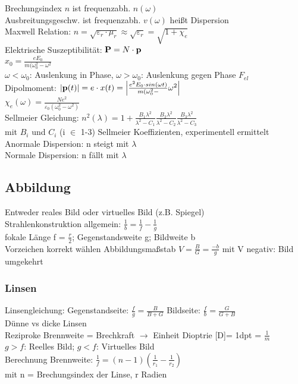 \documentclass[fs, footer]{latex4ei}
\begin{document}
\begin{multicols*}{4}
Brechungsindex $n$ ist frequenzabh. $n(\omega)$\\
Ausbreitungsgeschw. ist frequenzabh. $v(\omega)$ heißt Dispersion\\
Maxwell Relation: $n = \sqrt{\varepsilon_r\cdot \mu_r} \approx \sqrt{\varepsilon_r} = \sqrt{1+\chi_e}$\\ %
Elektrische Suszeptibilität: $\textbf{P} = N \cdot \textbf{p}$\\%
$x_0 = \frac{eE_0}{m(\omega_0^2-\omega^2}$\\
$\omega < \omega_0$: Auslenkung in Phase,
$\omega > \omega_0$: Auslenkung gegen Phase $F_{el}$\\
Dipolmoment: $|\textbf{p}(t)| = e\cdot x(t) = \left|\frac{e^2E_0\cdot sin(\omega t)}{m(\omega_0^2-}\omega^2\right|$\\ %
$\chi _e(\omega) = \frac{Ne^2}{\varepsilon_0(\omega_0^2 - \omega^2)}$\\
Sellmeier Gleichung: $n^2(\lambda) = 1 + \frac{B_1\lambda^2}{\lambda^2-C_1}\frac{B_2\lambda^2}{\lambda^2-C_2}\frac{B_3\lambda^2}{\lambda^2-C_3}$\\ mit $B_i$ und $C_i$ (i $\in$ 1-3) Sellmeier Koeffizienten, experimentell ermittelt\\
Anormale Dispersion: n steigt mit $\lambda$\\
Normale Dispersion: n fällt mit $\lambda$\\
\subsection{Abbildung}
Entweder reales Bild oder virtuelles Bild (z.B. Spiegel)\\
Strahlenkonstruktion allgemein: $\frac{1}{b}= \frac{1}{f} - \frac{1}{g}$\\
fokale Länge f = $\frac{r}{2}$; Gegenstandsweite g; Bildweite b\\
Vorzeichen korrekt wählen %
Abbildungsmaßstab $V = \frac{B}{G}=\frac{-b}{g}$ mit V negativ: Bild umgekehrt\\
\subsubsection{Linsen}
Linsengleichung:
Gegenstandseite: $\frac{f}{g} = \frac{B}{B+G}$
Bildseite: $\frac{f}{b}= \frac{G}{G+B}$\\
Dünne vs dicke Linsen\\ %
Reziproke Brennweite = Brechkraft $\rightarrow$ Einheit Dioptrie [D]= 1dpt = $\frac{1}{m}$\\
$g>f$: Reelles Bild;
$g<f$: Virtuelles Bild\\
Berechnung Brennweite: $\frac{1}{f}=(n-1)(\frac{1}{r_1}-\frac{1}{r_2})$\\
mit n = Brechungsindex der Linse, r Radien

\end{multicols*}
\end{document}
